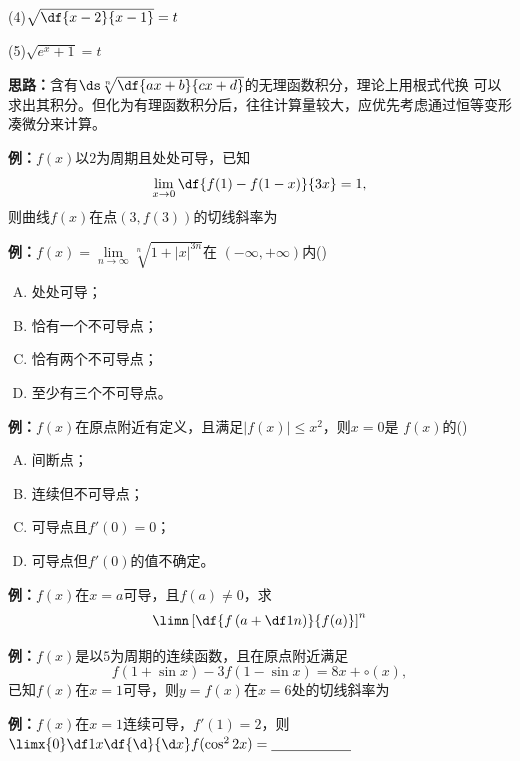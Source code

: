 (4)$\sqrt{\df{x-2}{x-1}}=t$

(5)$\sqrt{e^x+1}=t$

\begin{shaded}
{\bf 思路：}含有$\ds\sqrt[n]{\df{ax+b}{cx+d}}$的无理函数积分，理论上用根式代换
可以求出其积分。但化为有理函数积分后，往往计算量较大，应优先考虑通过恒等变形凑微分来计算。
\end{shaded}

\newpage


{\bf 例：}$f(x)$以$2$为周期且处处可导，已知
$$\lim\limits_{x\to 0}\df{f(1)-f(1-x)}{3x}=1,$$
则曲线$f(x)$在点$(3,f(3))$的切线斜率为\underline{\hspace{2cm}}

\bigskip

{\bf 例：}$f(x)=\lim\limits_{n\to\infty}\sqrt[n]{1+|x|^{3n}}$在
$(-\infty,+\infty)$内(\underline{\hspace{2cm}})
\begin{enumerate}[(A)]
  \setlength{\itemindent}{1cm}
  \item 处处可导；
  \item 恰有一个不可导点；
  \item 恰有两个不可导点；
  \item 至少有三个不可导点。
\end{enumerate}

\bigskip

{\bf 例：}$f(x)$在原点附近有定义，且满足$|f(x)|\leq x^2$，则$x=0$是
$f(x)$的(\underline{\hspace{2cm}})
\begin{enumerate}[(A)]
  \setlength{\itemindent}{1cm}
  \item 间断点；
  \item 连续但不可导点；
  \item 可导点且$f'(0)=0$；
  \item 可导点但$f'(0)$的值不确定。
\end{enumerate}

\bigskip

{\bf 例：}$f(x)$在$x=a$可导，且$f(a)\ne 0$，求
$$\limn\left[\df{f\left(a+\df1n\right)}{f(a)}\right]^n$$

{\bf 例：}$f(x)$是以$5$为周期的连续函数，且在原点附近满足
$$f(1+\sin x)-3f(1-\sin x)=8x+\circ(x),$$
已知$f(x)$在$x=1$可导，则$y=f(x)$在$x=6$处的切线斜率为\underline{\hspace{2cm}}

{\bf 例：}$f(x)$在$x=1$连续可导，$f'(1)=2$，则
$\limx{0}\df1x\df{\d}{\d x}f(\cos^22x)=\underline{\hspace{2cm}}$

